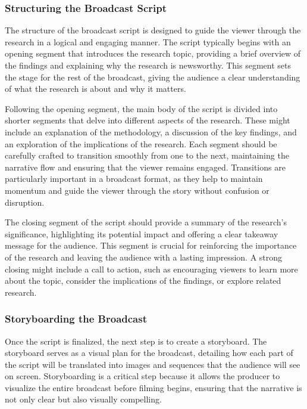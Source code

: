 \documentclass[
]{book}
\begin{document}
\subsubsection*{Structuring the Broadcast Script}\label{structuring-the-broadcast-script}

The structure of the broadcast script is designed to guide the viewer through the research in a logical and engaging manner. The script typically begins with an opening segment that introduces the research topic, providing a brief overview of the findings and explaining why the research is newsworthy. This segment sets the stage for the rest of the broadcast, giving the audience a clear understanding of what the research is about and why it matters.

Following the opening segment, the main body of the script is divided into shorter segments that delve into different aspects of the research. These might include an explanation of the methodology, a discussion of the key findings, and an exploration of the implications of the research. Each segment should be carefully crafted to transition smoothly from one to the next, maintaining the narrative flow and ensuring that the viewer remains engaged. Transitions are particularly important in a broadcast format, as they help to maintain momentum and guide the viewer through the story without confusion or disruption.

The closing segment of the script should provide a summary of the research's significance, highlighting its potential impact and offering a clear takeaway message for the audience. This segment is crucial for reinforcing the importance of the research and leaving the audience with a lasting impression. A strong closing might include a call to action, such as encouraging viewers to learn more about the topic, consider the implications of the findings, or explore related research.

\subsubsection*{Storyboarding the Broadcast}\label{storyboarding-the-broadcast}

Once the script is finalized, the next step is to create a storyboard. The storyboard serves as a visual plan for the broadcast, detailing how each part of the script will be translated into images and sequences that the audience will see on screen. Storyboarding is a critical step because it allows the producer to visualize the entire broadcast before filming begins, ensuring that the narrative is not only clear but also visually compelling.
\end{document}
